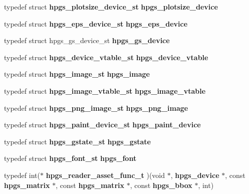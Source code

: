 \begin{DoxyCompactItemize}
\item 
typedef struct {\bf hpgs\_\-plotsize\_\-device\_\-st} {\bfseries hpgs\_\-plotsize\_\-device}\label{group__device_ga98a37f93bf5799c2d55d6e59d9f2c1b1}

\item 
typedef struct {\bf hpgs\_\-eps\_\-device\_\-st} {\bfseries hpgs\_\-eps\_\-device}\label{group__device_ga648708ea6527d8ffec62f075471c78f9}

\item 
typedef struct hpgs\_\-gs\_\-device\_\-st {\bfseries hpgs\_\-gs\_\-device}\label{group__device_ga21b6ff6181ec0b14869ddf3aef4fc0e0}

\item 
typedef struct {\bf hpgs\_\-device\_\-vtable\_\-st} {\bfseries hpgs\_\-device\_\-vtable}\label{group__device_ga503100ff768d14078274b7abe457ac93}

\item 
typedef struct {\bf hpgs\_\-image\_\-st} {\bfseries hpgs\_\-image}\label{group__device_gae374b15dff89c5d2c569c4250d4e3a2b}

\item 
typedef struct {\bf hpgs\_\-image\_\-vtable\_\-st} {\bfseries hpgs\_\-image\_\-vtable}\label{group__device_ga3d673430a5742c7e44d5494bb124d221}

\item 
typedef struct {\bf hpgs\_\-png\_\-image\_\-st} {\bfseries hpgs\_\-png\_\-image}\label{group__device_ga73df7e42f65edb523ba4869a4c20155c}

\item 
typedef struct {\bf hpgs\_\-paint\_\-device\_\-st} {\bfseries hpgs\_\-paint\_\-device}\label{group__device_ga4ca0f0bd51075fb9da27bf731ab5eefd}

\item 
typedef struct {\bf hpgs\_\-gstate\_\-st} {\bfseries hpgs\_\-gstate}\label{group__device_ga2cbad771732e3c16b8efa41910affdf3}

\item 
typedef struct {\bf hpgs\_\-font\_\-st} {\bfseries hpgs\_\-font}\label{group__device_gad67dc54687613dc2af6ca86aa2a61cb3}

\item 
typedef int($\ast$ {\bfseries hpgs\_\-reader\_\-asset\_\-func\_\-t} )(void $\ast$, {\bf hpgs\_\-device} $\ast$, const {\bf hpgs\_\-matrix} $\ast$, const {\bf hpgs\_\-matrix} $\ast$, const {\bf hpgs\_\-bbox} $\ast$, int)\label{group__device_gab994453805be117de7c3e23d451b3348}


\end{DoxyCompactItemize}
